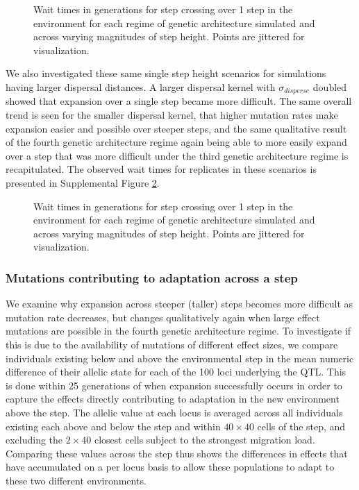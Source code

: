 \begin{figure}[h]
\centering
{}
\caption[Wait times for step crossing.]{Wait times in generations for step crossing over 1 step in the environment for each regime of genetic architecture simulated and across varying magnitudes of step height. Points are jittered for visualization.}
\label{fig:waittimes}
\end{figure}

We also investigated these same single step height scenarios for simulations having larger dispersal distances. A larger dispersal kernel with $\sigma_{disperse}$ doubled showed that expansion over a single step became more difficult. The same overall trend is seen for the smaller dispersal kernel, that higher mutation rates make expansion easier and possible over steeper steps, and the same qualitative result of the fourth genetic architecture regime again being able to more easily expand over a step that was more difficult under the third genetic architecture regime is recapitulated. The observed wait times for replicates in these scenarios is presented in Supplemental Figure \ref{fig:waittimes200}.

\begin{figure}[]
\centering
{}
\caption[Wait times for step crossing.]{Wait times in generations for step crossing over 1 step in the environment for each regime of genetic architecture simulated and across varying magnitudes of step height. Points are jittered for visualization.}
\label{fig:waittimes200}
\end{figure}

\subsubsection{Mutations contributing to adaptation across a step}

We examine why expansion across steeper (taller) steps becomes more difficult as mutation rate decreases, but changes qualitatively again when large effect mutations are possible in the fourth genetic architecture regime. To investigate if this is due to the availability of mutations of different effect sizes, we compare individuals existing below and above the environmental step in the mean numeric difference of their allelic state for each of the 100 loci underlying the QTL. This is done within 25 generations of when expansion successfully occurs in order to capture the effects directly contributing to adaptation in the new environment above the step. The allelic value at each locus is averaged across all individuals existing each above and below the step and within $40\times40$ cells of the step, and excluding the $2\times40$ closest cells subject to the strongest migration load. Comparing these values across the step thus shows the differences in effects that have accumulated on a per locus basis to allow these populations to adapt to these two different environments.

